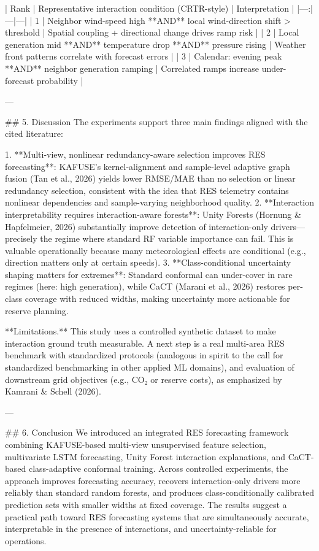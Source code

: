 | Rank | Representative interaction condition (CRTR-style) | Interpretation |
|---:|---|---|
| 1 | Neighbor wind-speed high **AND** local wind-direction shift > threshold | Spatial coupling + directional change drives ramp risk |
| 2 | Local generation mid **AND** temperature drop **AND** pressure rising | Weather front patterns correlate with forecast errors |
| 3 | Calendar: evening peak **AND** neighbor generation ramping | Correlated ramps increase under-forecast probability |

---

## 5. Discussion  
The experiments support three main findings aligned with the cited literature:

1. **Multi-view, nonlinear redundancy-aware selection improves RES forecasting**: KAFUSE’s kernel-alignment and sample-level adaptive graph fusion (Tan et al., 2026) yields lower RMSE/MAE than no selection or linear redundancy selection, consistent with the idea that RES telemetry contains nonlinear dependencies and sample-varying neighborhood quality.  
2. **Interaction interpretability requires interaction-aware forests**: Unity Forests (Hornung & Hapfelmeier, 2026) substantially improve detection of interaction-only drivers—precisely the regime where standard RF variable importance can fail. This is valuable operationally because many meteorological effects are conditional (e.g., direction matters only at certain speeds).  
3. **Class-conditional uncertainty shaping matters for extremes**: Standard conformal can under-cover in rare regimes (here: high generation), while CaCT (Marani et al., 2026) restores per-class coverage with reduced widths, making uncertainty more actionable for reserve planning.

**Limitations.** This study uses a controlled synthetic dataset to make interaction ground truth measurable. A next step is a real multi-area RES benchmark with standardized protocols (analogous in spirit to the call for standardized benchmarking in other applied ML domains), and evaluation of downstream grid objectives (e.g., CO₂ or reserve costs), as emphasized by Kamrani & Schell (2026).

---

## 6. Conclusion  
We introduced an integrated RES forecasting framework combining KAFUSE-based multi-view unsupervised feature selection, multivariate LSTM forecasting, Unity Forest interaction explanations, and CaCT-based class-adaptive conformal training. Across controlled experiments, the approach improves forecasting accuracy, recovers interaction-only drivers more reliably than standard random forests, and produces class-conditionally calibrated prediction sets with smaller widths at fixed coverage. The results suggest a practical path toward RES forecasting systems that are simultaneously accurate, interpretable in the presence of interactions, and uncertainty-reliable for operations.

